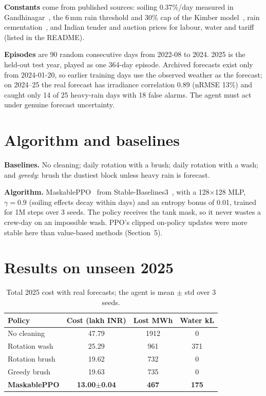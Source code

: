 \documentclass[10pt,twocolumn]{article}
\begin{document}
\textbf{Constants} come from published sources: soiling 0.37\%/day measured in Gandhinagar~\cite{valerino}, the 6\,mm rain threshold and 30\% cap of the Kimber model~\cite{pvlib}, rain cementation~\cite{valerino,renene}, and Indian tender and auction prices for labour, water and tariff (listed in the README).

\textbf{Episodes} are 90 random consecutive days from 2022-08 to 2024. 2025 is the held-out test year, played as one 364-day episode. Archived forecasts exist only from 2024-01-20, so earlier training days use the observed weather as the forecast; on 2024--25 the real forecast has irradiance correlation 0.89 (nRMSE 13\%) and caught only 14 of 25 heavy-rain days with 18 false alarms. The agent must act under genuine forecast uncertainty.

\section{Algorithm and baselines}
\textbf{Baselines.} No cleaning; daily rotation with a brush; daily rotation with a wash; and \emph{greedy}: brush the dustiest block unless heavy rain is forecast.

\textbf{Algorithm.} MaskablePPO~\cite{maskppo} from Stable-Baselines3~\cite{sb3}, with a 128$\times$128 MLP, $\gamma=0.9$ (soiling effects decay within days) and an entropy bonus of 0.01, trained for 1M steps over 3 seeds. The policy receives the tank mask, so it never wastes a crew-day on an impossible wash. PPO's clipped on-policy updates were more stable here than value-based methods (Section~5).

\section{Results on unseen 2025}

\begin{table}[h]
\centering\footnotesize\setlength{\tabcolsep}{4pt}
\begin{tabular}{lccc}
\toprule
Policy & Cost (lakh INR) & Lost MWh & Water kL\\
\midrule
No cleaning & 47.79 & 1912 & 0\\
Rotation wash & 25.29 & 961 & 371\\
Rotation brush & 19.62 & 732 & 0\\
Greedy brush & 19.63 & 735 & 0\\
\textbf{MaskablePPO} & \textbf{13.00$\pm$0.04} & \textbf{467} & \textbf{175}\\
\bottomrule
\end{tabular}
\caption{Total 2025 cost with real forecasts; the agent is mean $\pm$ std over 3 seeds.}
\end{table}
\end{document}
